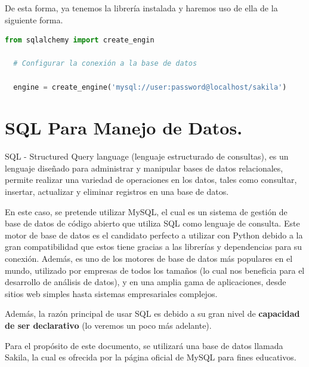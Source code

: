 \documentclass[12pt]{article}
\begin{document}
De esta forma, ya tenemos la librería instalada y haremos uso de ella de la siguiente forma.

\begin{lstlisting}[language=Python]
  from sqlalchemy import create_engin

  # Configurar la conexión a la base de datos

  engine = create_engine('mysql://user:password@localhost/sakila')
\end{lstlisting}
\vspace{12pt}

\section{SQL Para Manejo de Datos.}

SQL - Structured Query language (lenguaje estructurado de consultas), es un lenguaje diseñado para administrar y manipular bases de datos relacionales, permite realizar una variedad de operaciones en los datos, tales como consultar, insertar, actualizar y eliminar registros en una base de datos.

En este caso, se pretende utilizar MySQL, el cual es un sistema de gestión de base de datos de código abierto que utiliza SQL como lenguaje de consulta. Este motor de base de datos es el candidato perfecto a utilizar con Python debido a la gran compatibilidad que estos tiene gracias a las librerías y dependencias para su conexión. Además, es uno de los motores de base de datos más populares en el mundo, utilizado por empresas de todos los tamaños (lo cual nos beneficia para el desarrollo de análisis de datos), y en una amplia gama de aplicaciones, desde sitios web simples hasta sistemas empresariales complejos.

Además, la razón principal de usar SQL es debido a su gran nivel de \textbf{capacidad de ser declarativo} (lo veremos un poco más adelante).

Para el propósito de este documento, se utilizará una base de datos llamada Sakila, la cual es ofrecida por la página oficial de MySQL para fines educativos. 
\end{document}
